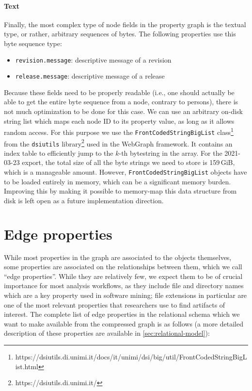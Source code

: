 \paragraph{Text}

Finally, the most complex type of node fields in the property graph is the
textual type, or rather, arbitrary sequences of bytes. The following properties
use this byte sequence type:

\begin{itemize}
    \setlength\itemsep{0em}
    \item \texttt{revision.message}: descriptive message of a revision
    \item \texttt{release.message}: descriptive message of a release
\end{itemize}

Because these fields need to be properly readable (i.e., one should actually be
able to get the entire byte sequence from a node, contrary to persons), there
is not much optimization to be done for this case. We can use an arbitrary
on-disk string list which maps each node ID to its property value, as long as
it allows random access. For this purpose we use the
\texttt{FrontCodedStringBigList}
class\footnote{https://dsiutils.di.unimi.it/docs/it/unimi/dsi/big/util/FrontCodedStringBigList.html}
from the \texttt{dsiutils} library\footnote{https://dsiutils.di.unimi.it/} used
in the WebGraph framework. It contains an index table to efficiently jump to
the $k$-th bytestring in the array.
For the 2021-03-23 export, the total size of all the byte strings we need to
store is 159\,GiB, which is a manageable amount.  However,
\texttt{FrontCodedStringBigList} objects have to be loaded entirely in memory,
which can be a significant memory burden. Improving this by making it possible
to memory-map this data structure from disk is left open as a future
implementation direction.

\section{Edge properties}

While most properties in the graph are associated to the objects themselves,
some properties are associated on the relationships between them, which we call
``edge properties''. While they are relatively few, we expect them to be of
crucial importance for most analysis workflows, as they include file and
directory names which are a key property used in software mining; file
extensions in particular are one of the most relevant properties that
researchers use to find artifacts of interest. The complete list of edge
properties in the relational schema which we want to make available from the
compressed graph is as follows (a more detailed description of these properties
are available in \cref{sec:relational-model}):

